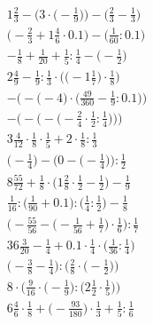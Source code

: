 \documentclass[8pt]{article}
\begin{document}
\begin{align}
1\frac{2}{3} - \Big(3 \cdot \big(-\frac{1}{9}\big)\Big) - \Big(\frac{2}{3} - \frac{1}{3}\Big) \\
\big(-\frac{2}{3} + 1\frac{4}{6} \cdot 0.1\big) - \big(\frac{1}{60} : 0.1\big) \\
-\frac{1}{8} + \frac{1}{20} + \frac{1}{5} : \frac{1}{4} - \big(-\frac{1}{2}\big) \\
2\frac{4}{9} - \frac{1}{9} : \frac{1}{3} \cdot \Big(\big(-1\frac{1}{7}\big) \cdot \frac{1}{8}\Big) \\
-\Big(-\big(-4\big) \cdot \big(\frac{49}{360} - \frac{1}{9} : 0.1\big)\Big) \\
-\bigg(-\Big(-\big(-\frac{2}{4} \cdot \frac{1}{2} : \frac{1}{4}\big)\Big)\bigg) \\
3\frac{4}{12} \cdot \frac{1}{8} \cdot \frac{1}{5} + 2 \cdot \frac{1}{8} : \frac{1}{3} \\
\Big(-\frac{1}{4}\Big) - \Big(0 - \big(-\frac{1}{4}\big)\Big) : \frac{1}{2} \\
8\frac{55}{72} + \frac{1}{8} \cdot \big(1\frac{2}{8} \cdot \frac{1}{2} - \frac{1}{2}\big) - \frac{1}{9} \\
\frac{1}{16} : \big(\frac{1}{90} + 0.1\big) : \big(\frac{1}{4} : \frac{1}{2}\big) - \frac{1}{8} \\
\Big(-\frac{55}{56} - \big(-\frac{1}{56} + \frac{1}{7}\big) \cdot \frac{1}{6}\Big) : \frac{1}{7} \\
36\frac{3}{20} - \frac{1}{4} + 0.1 \cdot \frac{1}{4} \cdot \big(\frac{1}{36} : \frac{1}{4}\big) \\
\Big(-\frac{3}{8} - \frac{1}{4}\Big) : \Big(\frac{2}{8} \cdot \big(-\frac{1}{2}\big)\Big) \\
8 \cdot \Big(\frac{9}{16} \cdot \big(-\frac{1}{9}\big) : \big(2\frac{1}{2} \cdot \frac{1}{5}\big)\Big) \\
6\frac{4}{6} \cdot \frac{1}{8} + \big(-\frac{93}{180}\big) \cdot \frac{1}{3} + \frac{1}{5} : \frac{1}{6}
\end{align}
\end{document}

